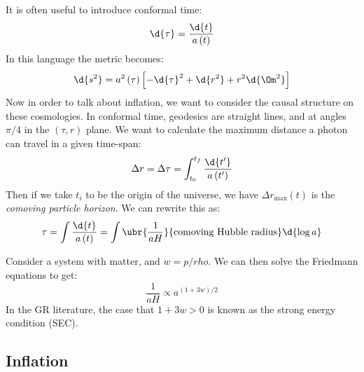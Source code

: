\documentclass{booc}
\begin{document}
It is often useful to introduce conformal time:
\begin{equation}
\d{\tau} = \frac{\d{t}}{a\left( t \right)}
\end{equation}
In this language the metric becomes:
\begin{equation}
\d{s^2} = a^2\left( \tau \right)\left[ 
-\d{\tau}^2 + \d{r^2} + r^2 \d{\Om^2}\right]
\end{equation}
Now in order to talk about inflation, we want to consider the causal structure on these
cosmologies. 
In conformal time, geodesics are straight lines, and at angles $\pi/4$ in the 
$\left( \tau , r \right)$ plane.
We want to calculate the maximum distance a photon can travel in a given
time-span:
\begin{align}
\Delta r = \Delta \tau = \int_{t_0}^{t_f} \frac{\d{t'}}{a\left( t' \right)}
\end{align}
Then if we take $t_i$ to be the origin of the universe, we have $\Delta r_{\max}\left( t \right)$
is the \emph{comoving particle horizon}.
We can rewrite this as:
\begin{equation}
\tau = \int \frac{\d{t}}{a\left( t \right)} = 
\int \ubr{\frac{1}{a H}}{\text{comoving Hubble radius}} \d{\log a}
\end{equation}

\begin{exm}
Consider a system with matter, and $w = p / rho$. 
We can then solve the Friedmann equations to get:
\begin{equation}
\frac{1}{aH} \propto a^{\left( 1 + 3w \right)/2}
\end{equation}
In the GR literature, the case that $1+3w > 0$ 
is known as the strong energy condition (SEC).
\end{exm}

\subsection{Inflation}
\end{document}

